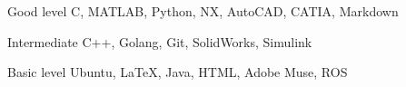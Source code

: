 \documentclass{tccv}
\begin{document}
\begin{factlist}

\item{Good level}
     {C, MATLAB, Python, NX, AutoCAD, CATIA, Markdown }

\item{Intermediate}
     {C++, Golang, Git, SolidWorks, Simulink}

\item{Basic level}
     {Ubuntu, \LaTeX, Java, HTML, Adobe Muse, ROS}

\end{factlist}





\end{document}
